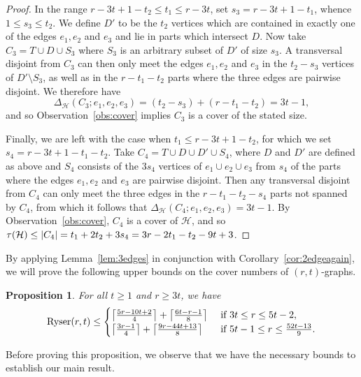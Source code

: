 \documentclass[a4paper,twoside,11pt]{article}
\DeclarePairedDelimiter{\ceil}{\lceil}{\rceil}
\DeclarePairedDelimiter{\card}{|}{|}
\newtheorem{prop}[thm]{Proposition}
\numberwithin{thm}{section}
\theoremstyle{definition}
\theoremstyle{remark}
\theoremstyle{definition}
\newcommand{\m}[1]{\mathcal{#1}}
\DeclareMathOperator{\Ryser}{Ryser}
\begin{document}
\begin{proof}
In the range $r-3t+1-t_2\leq t_1\leq r-3t$, set $s_3=r-3t+1-t_1$, whence $1\leq s_3\leq t_2$. We define $D'$ to be the $t_2$ vertices which are contained in exactly one of the edges $e_1, e_2$ and $e_3$ and lie in parts which intersect $D$.  Now take $C_3= T \cup D \cup S_3$ where $S_3$ is an arbitrary subset of $D'$ of size $s_3$.  A transversal disjoint from $C_3$ can then only meet the edges $e_1, e_2$ and $e_3$ in the $t_2 - s_3$ vertices of $D' \setminus S_3$, as well as in the $r - t_1 - t_2$ parts where the three edges are pairwise disjoint. We therefore have
\[\Delta_{\m H}(C_3;e_1,e_2,e_3)=(t_2-s_3)+(r-t_1-t_2)=3t-1, \]
and so Observation~\ref{obs:cover} implies $C_3$ is a cover of the stated size.

Finally, we are left with the case when $t_1\leq r-3t+1-t_2$, for which we set $s_4 = r - 3t + 1 - t_1 - t_2$. Take $C_4 = T \cup D \cup D' \cup S_4$, where $D$ and $D'$ are defined as above and $S_4$ consists of the $3s_4$ vertices of $e_1 \cup e_2 \cup e_3$ from $s_4$ of the parts where the edges $e_1, e_2$ and $e_3$ are pairwise disjoint.  Then any transversal disjoint from $C_4$ can only meet the three edges in the $r - t_1 - t_2 - s_4$ parts not spanned by $C_4$, from which it follows that $\Delta_{\m H}(C_4; e_1, e_2, e_3) = 3t - 1$. By Observation~\ref{obs:cover}, $C_4$ is a cover of $\m H$, and so $\tau(\m H) \le \card{C_4} = t_1 + 2t_2 + 3s_4 = 3r - 2t_1 - t_2 - 9t + 3$.
\end{proof}

By applying Lemma~\ref{lem:3edges} in conjunction with Corollary~\ref{cor:2edgeagain}, we will prove the following upper bounds on the cover numbers of $(r,t)$-graphs.

\begin{prop} \label{prop:3edgeupperbound}
For all $t \ge 1$ and $r \ge 3t$, we have 
\[  \Ryser(r,t)\leq \begin{cases}
    \ceil*{\frac{5r-10t+2}{4}} +\ceil*{\frac{6t-r-1}{8}} & \mbox{ if } 3t\leq r \leq 5t-2, \\
    \ceil*{\frac{3r-1}{4}} + \ceil*{\frac{9r-44t+13}{8}} & \mbox{ if } 5t-1 \leq r \leq \frac{52t-13}{9}.
\end{cases} \]
\end{prop}

Before proving this proposition, we observe that we have the necessary bounds to establish our main result.
\end{document}
